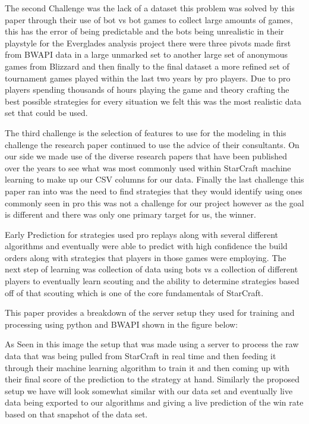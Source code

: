 \documentclass[a4paper,12pt]{report}
\begin{document}
The second Challenge was the lack of a dataset this problem was solved by this paper through their use of bot vs bot games to collect large amounts of games, this has the error of being predictable and the bots being unrealistic in their playstyle for the Everglades analysis project there were three pivots made first from BWAPI data in a large unmarked set to another large set of anonymous games from Blizzard and then finally to the final dataset a more refined set of tournament games played within the last two years by pro players. Due to pro  players spending thousands of hours playing the game and theory crafting the best possible strategies for every situation we felt this was the most realistic data set that could be used.

The third challenge is the selection of features to use for the modeling in this challenge the research paper continued to use the advice of their consultants. On our side we made use of the diverse research papers that have been published over the years to see what was most commonly used within StarCraft machine learning to make up our CSV columns for our data. Finally the last challenge this paper ran into was the need to find strategies that they would identify using ones commonly seen in pro this was not a challenge for our project however as the goal is different and there was only one primary target for us, the winner.

Early Prediction for strategies used pro replays along with several different algorithms and eventually were able to predict with high confidence the build orders along with strategies that players in those games were employing. The next step of learning was collection of data using bots vs a collection of different players to eventually learn scouting and the ability to determine strategies based off of that scouting which is one of the core fundamentals of StarCraft.

This paper provides a breakdown of the server setup they used for training and processing using python and BWAPI shown in the figure below:


As Seen in this image the setup that was made using a server to process the raw data that was being pulled from StarCraft in real time and then feeding it through their machine learning algorithm to train it and then coming up with their final score of the prediction to the strategy at hand. Similarly the proposed setup we have will look somewhat similar with our data set and eventually live data being exported to our algorithms and giving a live prediction of the win rate based on that snapshot of the data set.
\end{document}
